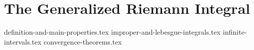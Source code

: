\chapter{The Generalized Riemann Integral}
{definition-and-main-properties.tex}
{improper-and-lebesgue-integrals.tex}
{infinite-intervals.tex}
{convergence-theorems.tex}
